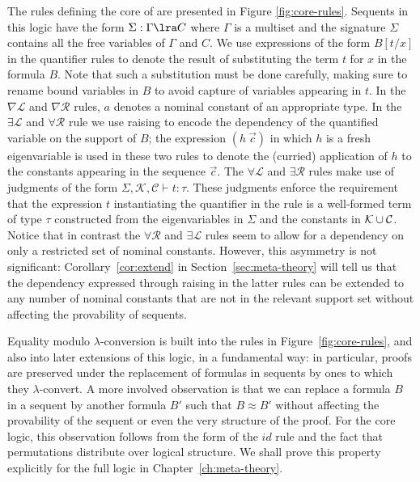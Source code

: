 The rules defining the core of \logic are presented in Figure
\ref{fig:core-rules}. Sequents in this logic have the form $\Sigma :
\Gamma \lra C$ where $\Gamma$ is a multiset and the signature $\Sigma$
contains all the free variables of $\Gamma$ and $C$. We use
expressions of the form $B[t/x]$ in the quantifier rules to denote the
result of substituting the term $t$ for $x$ in the formula $B$. Note
that such a substitution must be done carefully, making sure to rename
bound variables in $B$ to avoid capture of variables appearing in $t$.
In the $\nabla\mathcal{L}$ and $\nabla\mathcal{R}$ rules, $a$ denotes
a nominal constant of an appropriate type. In the $\exists\mathcal{L}$
and $\forall\mathcal{R}$ rule we use raising \cite{miller92jsc} to
encode the dependency of the quantified variable on the support of
$B$; the expression $(h\ \vec{c})$ in which $h$ is a fresh
eigenvariable is used in these two rules to denote the (curried)
application of $h$ to the constants appearing in the sequence
$\vec{c}$. The $\forall\mathcal{L}$ and $\exists\mathcal{R}$ rules
make use of judgments of the form $\Sigma, \mathcal{K}, \mathcal{C}
\vdash t : \tau$. These judgments enforce the requirement that the
expression $t$ instantiating the quantifier in the rule is a
well-formed term of type $\tau$ constructed from the eigenvariables in
$\Sigma$ and the constants in ${\cal K} \cup {\cal C}$. Notice that in
contrast the $\forall\mathcal{R}$ and $\exists\mathcal{L}$ rules seem
to allow for a dependency on only a restricted set of nominal
constants. However, this asymmetry is not significant:
Corollary~\ref{cor:extend} in Section~\ref{sec:meta-theory} will tell
us that the dependency expressed through raising in the latter rules
can be extended to any number of nominal constants that are not in the
relevant support set without affecting the provability of sequents.

Equality modulo $\lambda$-conversion is built into the rules in
Figure~\ref{fig:core-rules}, and also into later extensions of
this logic, in a fundamental way: in particular, proofs are preserved
under the replacement of formulas in sequents by ones to which they
$\lambda$-convert.  A more involved observation
is that we can replace a formula $B$ in a sequent by another formula
$B'$ such that $B\approx B'$ without affecting the provability of the
sequent or even the very structure of the proof. For the core logic,
this observation follows from the form of the $id$ rule and the fact
that permutations distribute over logical structure. We shall prove
this property explicitly for the full logic in
Chapter~\ref{ch:meta-theory}.

